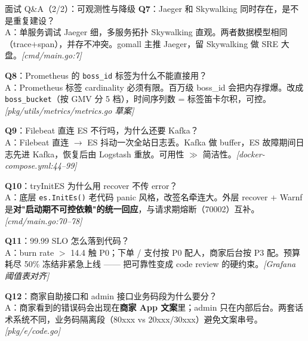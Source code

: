 \documentclass[aspectratio=169,11pt]{beamer}
\begin{document}
\begin{frame}[shrink]{面试 Q\&A（2/2）：可观测性与降级}
\textbf{Q7}：Jaeger 和 Skywalking 同时存在，是不是重复建设？\\
\hspace{4mm}\small A：单服务调试 Jaeger 细，多服务拓扑 Skywalking 直观。两者数据模型相同（trace+span），并存不冲突。gomall 主推 Jaeger，留 Skywalking 做 SRE 大盘。\textit{[cmd/main.go:7]}

\vspace{1mm}
\textbf{Q8}：Prometheus 的 \texttt{boss\_id} 标签为什么不能直接用？\\
\hspace{4mm}\small A：Prometheus 标签 cardinality 必须有限。百万级 boss\_id 会把内存撑爆。改成 \texttt{boss\_bucket}（按 GMV 分 5 档），时间序列数 = 标签笛卡尔积，可控。\textit{[pkg/utils/metrics/metrics.go 草案]}

\vspace{1mm}
\textbf{Q9}：Filebeat 直连 ES 不行吗，为什么还要 Kafka？\\
\hspace{4mm}\small A：Filebeat 直连 $\to$ ES 抖动一次全站日志丢。Kafka 做 buffer，ES 故障期间日志先进 Kafka，恢复后由 Logstash 重放。可用性 $\gg$ 简洁性。\textit{[docker-compose.yml:44--99]}

\vspace{1mm}
\textbf{Q10}：tryInitES 为什么用 recover 不传 error？\\
\hspace{4mm}\small A：底层 \texttt{es.InitEs()} 老代码 panic 风格，改签名牵连大。外层 recover + Warnf 是\textbf{对"启动期不可控依赖"的统一回应}，与请求期熔断（70002）互补。\textit{[cmd/main.go:70--78]}

\vspace{1mm}
\textbf{Q11}：99.99 SLO 怎么落到代码？\\
\hspace{4mm}\small A：burn rate $>$ 14.4 触 P0；下单 / 支付按 P0 配人，商家后台按 P3 配。预算耗尽 50\% 冻结非紧急上线 —— 把可靠性变成 code review 的硬约束。\textit{[Grafana 阈值表对齐]}

\vspace{1mm}
\textbf{Q12}：商家自助接口和 admin 接口业务码段为什么要分？\\
\hspace{4mm}\small A：商家看到的错误码会出现在\textbf{商家 App 文案}里；admin 只在内部后台。两套话术系统不同，业务码隔离段（80xxx vs 20xxx/30xxx）避免文案串号。\textit{[pkg/e/code.go]}
\end{frame}
\end{document}
